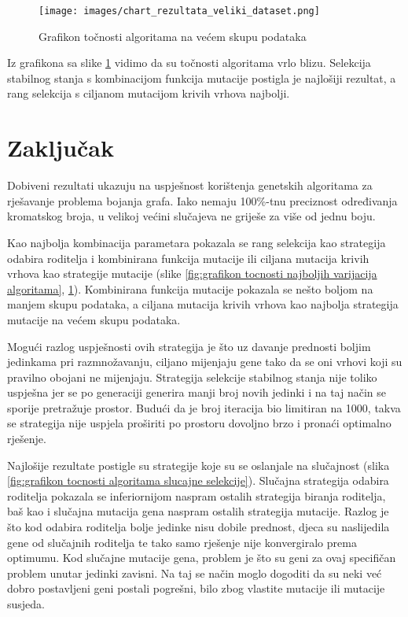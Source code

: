 \documentclass[times, utf8, zavrsni, numeric]{fer}
\begin{document}
\begin{figure}[h]
\centering
\texttt{[image: images/chart\_rezultata\_veliki\_dataset.png]}
\caption{Grafikon točnosti algoritama na većem skupu podataka}
\label{fig:grafikon na vecem skupu podataka}
\end{figure}

Iz grafikona sa slike \ref{fig:grafikon na vecem skupu podataka} vidimo da su točnosti algoritama vrlo blizu. Selekcija stabilnog stanja s kombinacijom funkcija mutacije postigla je najlošiji rezultat, a rang selekcija s ciljanom mutacijom krivih vrhova najbolji.

\chapter{Zaključak}
Dobiveni rezultati ukazuju na uspješnost korištenja genetskih algoritama za rješavanje problema bojanja grafa. Iako nemaju 100\%-tnu preciznost određivanja kromatskog broja, u velikoj većini slučajeva ne griješe za više od jednu boju. 

Kao najbolja kombinacija parametara pokazala se rang selekcija kao strategija odabira roditelja i kombinirana funkcija mutacije ili ciljana mutacija krivih vrhova kao strategije mutacije (slike \ref{fig:grafikon tocnosti najboljih varijacija algoritama}, \ref{fig:grafikon na vecem skupu podataka}). Kombinirana funkcija mutacije pokazala se nešto boljom na manjem skupu podataka, a ciljana mutacija krivih vrhova kao najbolja strategija mutacije na većem skupu podataka.

Mogući razlog uspješnosti ovih strategija je što uz davanje prednosti boljim jedinkama pri razmnožavanju, ciljano mijenjaju gene tako da se oni vrhovi koji su pravilno obojani ne mijenjaju. Strategija selekcije stabilnog stanja nije toliko uspješna jer se po generaciji generira manji broj novih jedinki i na taj način se sporije pretražuje prostor. Budući da je broj iteracija bio limitiran na 1000, takva se strategija nije uspjela proširiti po prostoru dovoljno brzo i pronaći optimalno rješenje.

Najlošije rezultate postigle su strategije koje su se oslanjale na slučajnost (slika \ref{fig:grafikon tocnosti algoritama slucajne selekcije}). Slučajna strategija odabira roditelja pokazala se inferiornijom naspram ostalih strategija biranja roditelja, baš kao i slučajna mutacija gena naspram ostalih strategija mutacije. Razlog je što kod odabira roditelja bolje jedinke nisu dobile prednost, djeca su naslijedila gene od slučajnih roditelja te tako samo rješenje nije konvergiralo prema optimumu. Kod slučajne mutacije gena, problem je što su geni za ovaj specifičan problem unutar jedinki zavisni. Na taj se način moglo dogoditi da su neki već dobro postavljeni geni postali pogrešni, bilo zbog vlastite mutacije ili mutacije susjeda.
\end{document}
